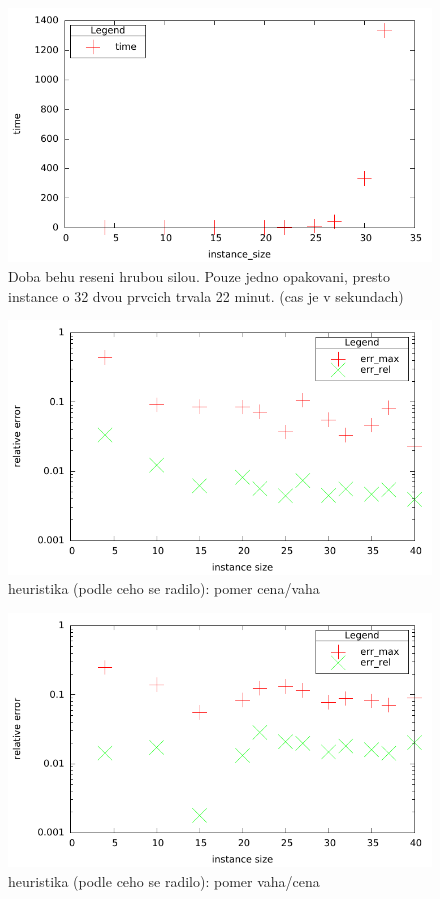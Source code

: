 \documentclass[12pt,a4paper]{article}
\begin{document}
\begin{figure}[H]
	\caption{Doba behu reseni hrubou silou. Pouze jedno opakovani, presto instance o 32 dvou prvcich trvala 22 minut. (cas je v sekundach) }
	\includegraphics{./time_b.png}
\end{figure}

\begin{figure}[H]
	\caption{heuristika (podle ceho se radilo): pomer cena/vaha}
	\includegraphics{./err_h1.pdf}
\end{figure}

\begin{figure}[H]
	\caption{heuristika (podle ceho se radilo): pomer vaha/cena}
	\includegraphics{./err_h2.pdf}
\end{figure}
\end{document}
